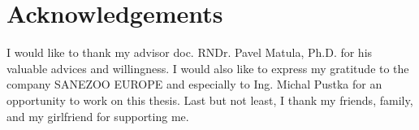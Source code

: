 \chapter*{Acknowledgements}
\noindent
I would like to thank my advisor doc. RNDr. Pavel Matula, Ph.D. for his
valuable advices and willingness. I would also like to express my gratitude
to the company SANEZOO EUROPE and especially to Ing. Michal Pustka for an
opportunity to work on this thesis. Last but not least, I thank my friends,
family, and my girlfriend for supporting me.